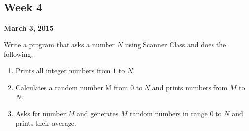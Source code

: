 \documentclass[12pt,letterpaper,twoside]{article}
\begin{document}


\subsection*{Week 4}
\hfill \textbf{March 3, 2015}

Write a program that asks a number $N$ using Scanner Class and does the following.

\begin{enumerate}[itemsep=0pt]
\item Prints all integer numbers from $1$ to $N$.
\item Calculates a random number M from $0$ to $N$ and prints numbers from $M$ to $N$.
\item Asks for number $M$ and generates $M$ random numbers in range $0$ to $N$ and prints their average.
\end{enumerate}
\end{document}
